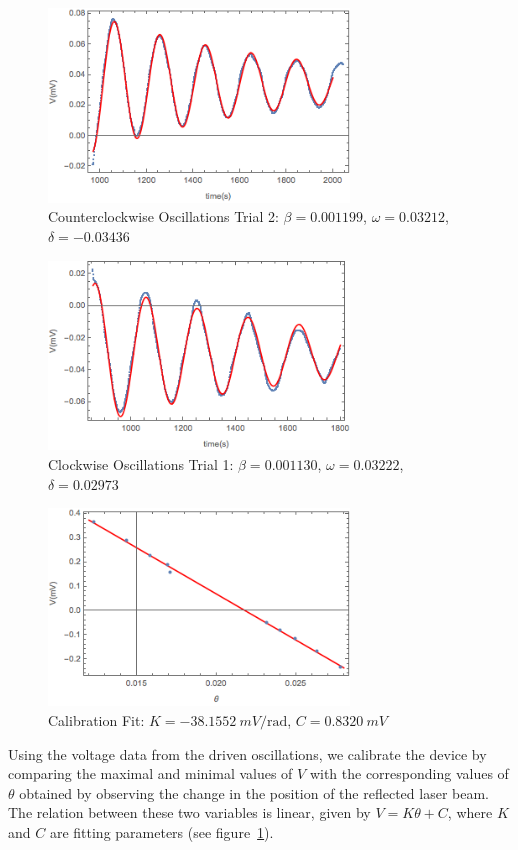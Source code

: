 \documentclass[aps, reprint,amsmath,amssymb]{revtex4-1} %
\begin{document}
\begin{figure}[b]
\centering
\includegraphics[width=8cm]{figs/counterclockwise2plot.png}
\caption{Counterclockwise Oscillations Trial 2: $\beta = 0.001199$, $\omega = 0.03212$, $\delta=-0.03436$}
\end{figure}

\begin{figure}[t]
\centering
\includegraphics[width=8cm]{figs/clockwise1plot.png}
\caption{Clockwise Oscillations Trial 1: $\beta = 0.001130$, $\omega = 0.03222$, $\delta=0.02973$}
\end{figure}

\begin{figure}
\centering
\includegraphics[width=8cm]{figs/calibration.png}
\caption{Calibration Fit: $K=-\SI{38.1552}{mV \per \radian}$, $C=\SI{0.8320}{mV}$}
\label{fig:calibration}
\end{figure} 

Using the voltage data from the driven oscillations, we calibrate the
device by comparing the maximal and minimal values of $V$ with the
corresponding values of $\theta$ obtained by observing the change in the
position of the reflected laser beam. The relation between these two
variables is linear, given by $V = K \theta + C$, where $K$
and $C$ are fitting parameters (see figure~\ref{fig:calibration}).
\end{document}
